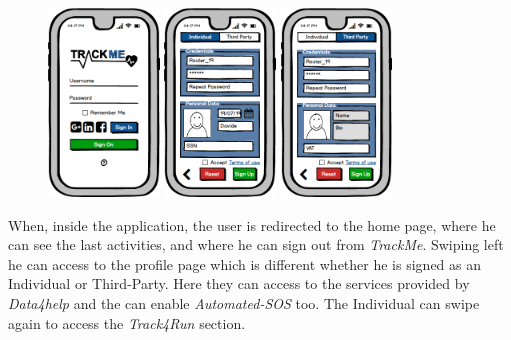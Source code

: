 \documentclass[a4paper]{article}
\begin{document}
\begin{figure}[!htpb]
    	\centering
    	\includegraphics[height=50mm]{images/mockups/Login_Registration.png}
    	\includegraphics[height=50mm]{images/mockups/RegistrationForm.png}
    	\includegraphics[height=50mm]{images/mockups/ThirdPartyRegistration.png}
    	\newline
    	\newline
        \end{figure}
 
When, inside the application, the user is redirected to the home page, where he can see the last activities, and where he can sign out from \textit{TrackMe}.
\newline
Swiping left he can access to the profile page which is different whether he is signed as an Individual or Third-Party. Here they can access to the services provided by \textit{Data4help} and the can enable \textit{Automated-SOS} too. The Individual can swipe again to access the \textit{Track4Run} section.
\end{document}
